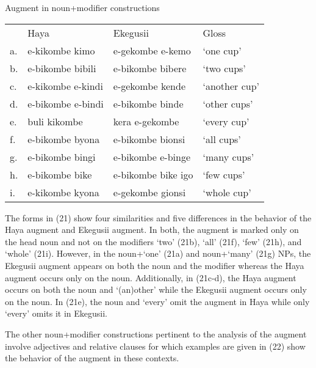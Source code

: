 \documentclass[output=paper]{langscibook}
\begin{document}
\begin{exe}
\ex Augment in noun+modifier constructions\\
\label{hayagusii21}
\begin{tabular}{llll}
       &       Haya	&			Ekegusii	&		Gloss		 \\
a.&	e-kikombe kimo	&	e-gekombe e-kemo     	&	‘one cup’ \\
b. &	e-bikombe bibili &		e-bikombe bibere &		‘two cups’\\
c. &	e-kikombe e-kindi	 &	e-gekombe kende	 &	‘another cup’\\
d. &	e-bikombe e-bindi	&	e-bikombe binde	 &	‘other cups’\\
e. & buli kikombe		&	kera e-gekombe	&	‘every cup’\\
f. &	e-bikombe byona	&	e-bikombe bionsi &		‘all cups’\\
g. &	e-bikombe bingi &		e-bikombe e-binge	&	‘many cups’\\
h. &	e-bikombe bike 	&	e-bikombe bike igo	&	‘few cups’\\
i. &	e-kikombe kyona &		e-gekombe gionsi	&	‘whole cup’\\

\end{tabular}
\end{exe}
The forms in (21) show four similarities and five differences in the behavior of the Haya augment and Ekegusii augment. In both, the augment is marked only on the head noun and not on the modifiers ‘two’ (21b), ‘all’ (21f), ‘few’ (21h), and ‘whole’ (21i). However, in the noun+‘one’ (21a) and noun+‘many’ (21g) NPs, the Ekegusii augment appears on both the noun and the modifier whereas the Haya augment occurs only on the noun. Additionally, in (21c-d), the Haya augment occurs on both the noun and ‘(an)other’ while the Ekegusii augment occurs only on the noun. In (21e), the noun and ‘every’ omit the augment in Haya while only ‘every’ omits it in Ekegusii.

	The other noun+modifier constructions pertinent to the analysis of the augment involve adjectives and relative clauses for which examples are given in (22) show the behavior of the augment in these contexts. 
\end{document}
